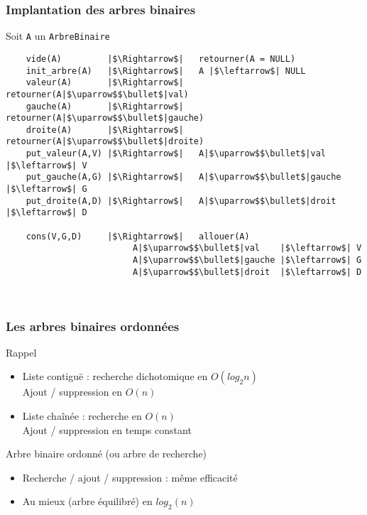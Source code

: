 \documentclass[table,handout,tikz,12pt,svgnames]{beamer}
\begin{document}
\begin{frame}[fragile=singleslide]
	\frametitle{Implantation des arbres binaires}
	\begin{block}{Soit \texttt{A} un \texttt{ArbreBinaire}}
		\begin{verbatim}
	vide(A)         |$\Rightarrow$|   retourner(A = NULL)
	init_arbre(A)   |$\Rightarrow$|   A |$\leftarrow$| NULL
	valeur(A)       |$\Rightarrow$|   retourner(A|$\uparrow$$\bullet$|val)
	gauche(A)       |$\Rightarrow$|   retourner(A|$\uparrow$$\bullet$|gauche)
	droite(A)       |$\Rightarrow$|   retourner(A|$\uparrow$$\bullet$|droite)
	put_valeur(A,V) |$\Rightarrow$|   A|$\uparrow$$\bullet$|val    |$\leftarrow$| V
	put_gauche(A,G) |$\Rightarrow$|   A|$\uparrow$$\bullet$|gauche |$\leftarrow$| G
	put_droite(A,D) |$\Rightarrow$|   A|$\uparrow$$\bullet$|droit  |$\leftarrow$| D

	cons(V,G,D)     |$\Rightarrow$|   allouer(A)
                         A|$\uparrow$$\bullet$|val    |$\leftarrow$| V
                         A|$\uparrow$$\bullet$|gauche |$\leftarrow$| G
                         A|$\uparrow$$\bullet$|droit  |$\leftarrow$| D
	
	
		\end{verbatim}
	\end{block}
\end{frame}


\begin{frame}[fragile=singleslide]
	\frametitle{Les arbres binaires ordonnées}
	\begin{block}{Rappel}
		\begin{itemize}
			\item Liste contiguë : recherche dichotomique en $O(log_2n)$\\
			Ajout / suppression en $O(n)$ 
			\item Liste chaînée : recherche en $O(n)$\\
			Ajout / suppression en temps constant
		\end{itemize}
	\end{block}
	\begin{block}{Arbre binaire ordonné (ou arbre de recherche)}
		\begin{itemize}
			\item Recherche / ajout / suppression : même efficacité
			\item Au mieux (arbre équilibré) en $log_2(n)$
		\end{itemize}
	\end{block}
\end{frame}
\end{document}
